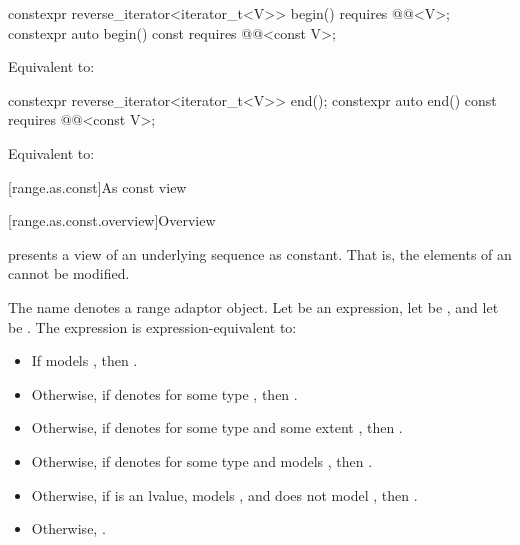%
\begin{itemdecl}
constexpr reverse_iterator<iterator_t<V>> begin() requires @@<V>;
constexpr auto begin() const requires @@<const V>;
\end{itemdecl}

\begin{itemdescr}
\pnum
\effects
Equivalent to: 
\end{itemdescr}

%
\begin{itemdecl}
constexpr reverse_iterator<iterator_t<V>> end();
constexpr auto end() const requires @@<const V>;
\end{itemdecl}

\begin{itemdescr}
\pnum
\effects
Equivalent to: 
\end{itemdescr}

[range.as.const]{As const view}

[range.as.const.overview]{Overview}

\pnum
{} presents a view of an underlying sequence as constant.
That is, the elements of an  cannot be modified.

\pnum
The name  denotes
a range adaptor object.
Let  be an expression,
let  be , and
let  be .
The expression  is expression-equivalent to:
\begin{itemize}
\item
If  models ,
then .
\item
Otherwise,
if  denotes 
for some type , then .
\item
Otherwise,
if  denotes 
for some type  and some extent ,
then .
\item
Otherwise,
if  denotes  for some type  and
 models ,
then .
\item
Otherwise,
if  is an lvalue,
 models , and
 does not model ,
then .
\item
Otherwise, .
\end{itemize}

